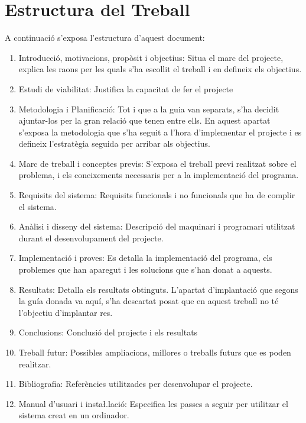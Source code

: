 \documentclass[11pt,a4paper,twoside]{report}
\begin{document}
  \section{Estructura del Treball}
  A continuació s'exposa l'estructura d'aquest document: 
  \begin{enumerate}
    \item Introducció, motivacions, propòsit i objectius: Situa el marc del projecte, explica les raons per les quals s'ha escollit el treball i en defineix els objectius.
    \item Estudi de viabilitat: Justifica la capacitat de fer el projecte
    \item Metodologia i Planificació: Tot i que a la guia van separats, s'ha decidit ajuntar-los per la gran relació que tenen entre ells. En aquest apartat s'exposa la metodologia que s'ha seguit a l'hora d'implementar el projecte i es defineix l'estratègia seguida per arribar als objectius.
    \item Marc de treball i conceptes previs: S'exposa el treball previ realitzat sobre el problema, i els coneixements necessaris per a la implementació del programa.
    \item Requisits del sistema: Requisits funcionals i no funcionals que ha de complir el sistema.
    \item Anàlisi i disseny del sistema: Descripció del maquinari i programari utilitzat durant el desenvolupament del projecte.
    \item Implementació i proves: Es detalla la implementació del programa, els problemes que han aparegut i les solucions que s'han donat a aquests.
    \item Resultats: Detalla els resultats obtinguts. L'apartat d'implantació que segons la guía donada va aquí, s'ha descartat posat que en aquest treball no té l'objectiu d'implantar res.
    \item Conclusions: Conclusió del projecte i els resultats
    \item Treball futur: Possibles ampliacions, millores o treballs futurs que es poden realitzar.
    \item Bibliografia: Referències utilitzades per desenvolupar el projecte.
    \item Manual d'usuari i insta\l.lació: Especifica les passes a seguir per utilitzar el sistema creat en un ordinador.

  \end{enumerate}
\end{document}
